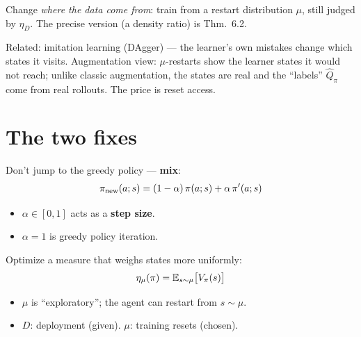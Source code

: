 \begin{keybox}[title={Instead}]
Change \emph{where the data come from}: train from a restart distribution $\mu$, still judged by $\eta_D$. The precise version (a density ratio) is Thm.~6.2.
\end{keybox}

\begin{notebox}
Related: imitation learning (DAgger) --- the learner's own mistakes change which states it visits. Augmentation view: $\mu$-restarts show the learner states it would not reach; unlike classic augmentation, the states are real and the ``labels'' $\hat Q_\pi$ come from real rollouts. The price is reset access.
\end{notebox}

\section{The two fixes}

\begin{pair}
\begin{warmbox}[title={1. Conservative update $\to$ Gap 1}]
Don't jump to the greedy policy --- \textbf{mix}:
\begin{gather*}
  \pi_{\mathrm{new}}(a;s) = (1-\alpha)\,\pi(a;s) + \alpha\,\pi'(a;s)
\end{gather*}
\begin{itemize}
  \item $\alpha\in[0,1]$ acts as a \textbf{step size}.
  \item $\alpha=1$ is greedy policy iteration.
\end{itemize}
\end{warmbox}
\begin{coolbox}[title={2. Restart distribution $\mu$ $\to$ Gap 2}]
Optimize a measure that weighs states more uniformly:
\begin{gather*}
  \eta_\mu(\pi) = \mathbb{E}_{s\sim\mu}\big[V_\pi(s)\big]
\end{gather*}
\begin{itemize}
  \item $\mu$ is ``exploratory''; the agent can restart from $s\sim\mu$.
  \item $D$: deployment (given). $\mu$: training resets (chosen).
\end{itemize}
\end{coolbox}
\end{pair}

